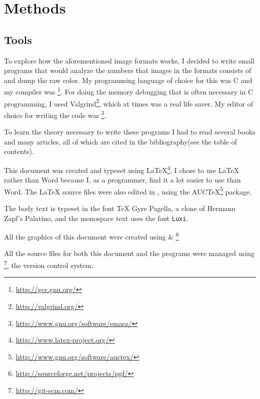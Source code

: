 \begin{comment}
  
\end{comment}

\chapter{Methods}
\label{cha:method}

\newcommand{\CC}{C\nolinebreak\hspace{-.05em}\raisebox{.4ex}{\tiny\bfseries +}\nolinebreak\hspace{-.10em}\raisebox{.4ex}{\tiny\bfseries +}}

\section{Tools}

\newcommand{\credits}[1]{\footnote{\url{#1}}}

To explore how the aforementioned image formats works, I decided to
write small programs that would analyze the numbers that images in the
formats consists of and dump the raw color. My programming language of
choice for this was \CC{} and my compiler was
\gcc\credits{http://gcc.gnu.org/}. For doing the memory debugging that
is often necessary in \CC{} programming, I used
Valgrind\credits{http://valgrind.org/}, which at times was a real life
saver. My editor of choice for writing the code was
\emacs\credits{http://www.gnu.org/software/emacs/}.

To learn the theory necessary to write these programs I had to read
several books and many articles, all of which are cited in the
bibliography(see the table of contents).

This document was created and typeset using
\LaTeX{}\credits{http://www.latex-project.org/}. I chose to use
\LaTeX{} rather than Word because I, as a programmer, find it a lot
easier to use than Word. The \LaTeX{} source files were also edited in
\emacs, using the
AUC\TeX{}\credits{http://www.gnu.org/software/auctex/} package.

The body text is typeset in the font \TeX{} Gyre Pagella, a clone of
Hermann Zapf's Palatino, and the monospace text uses the font
\texttt{Luxi}.



All the graphics of this document were created using
\tikzname \& \pgf\credits{http://sourceforge.net/projects/pgf/}

All the source files for both this document and the programs were
managed using \git\credits{http://git-scm.com/}, the version control system.

